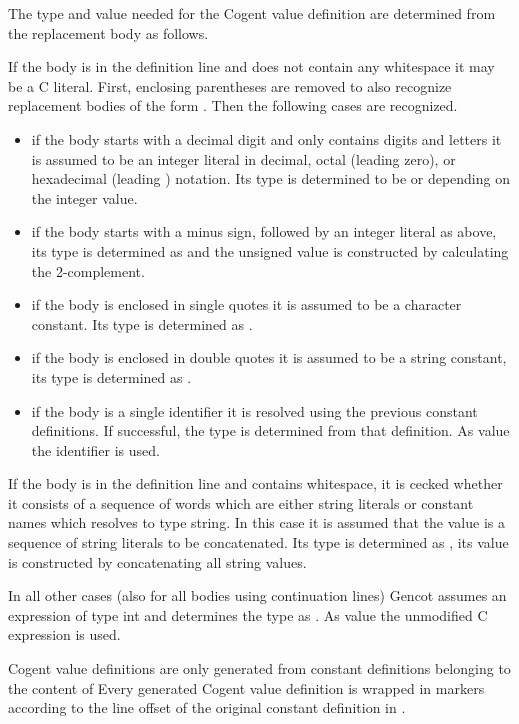 The type and value needed for the Cogent value definition are determined from the replacement body as follows.

If the body is in the definition line and does not contain any whitespace it may be a C literal. First, 
enclosing parentheses are removed to also recognize replacement bodies of the form . Then 
the following cases are recognized.
\begin{itemize}
\item if the body starts with a decimal digit and only contains digits and letters it is assumed to be an 
integer literal in decimal, octal (leading zero), or hexadecimal (leading ) notation. Its type
is determined to be  or  depending on the integer value.
\item if the body starts with a minus sign, followed by an integer literal as above, its type is
determined as  and the unsigned value is constructed by calculating the 2-complement.
\item if the body is enclosed in single quotes it is assumed to be a character constant. Its type is
determined as .
\item if the body is enclosed in double quotes it is assumed to be a string constant, its type is determined
as .
\item if the body is a single identifier it is resolved using the previous constant definitions. If successful,
the type is determined from that definition. As value the identifier is used.
\end{itemize}

If the body is in the definition line and contains whitespace, it is cecked whether it consists of a sequence
of words which are either string literals or constant names which resolves to type string. In this case it 
is assumed that the value is a sequence of string literals to be concatenated. Its type is determined as 
, its value is constructed by concatenating all string values.

In all other cases (also for all bodies using continuation lines) Gencot assumes an expression of type int
and determines the type as . As value the unmodified C expression is used.

Cogent value definitions are only generated from constant definitions belonging to the content of 
Every generated Cogent value definition is wrapped in  markers according to the line offset
of the original constant definition in .

